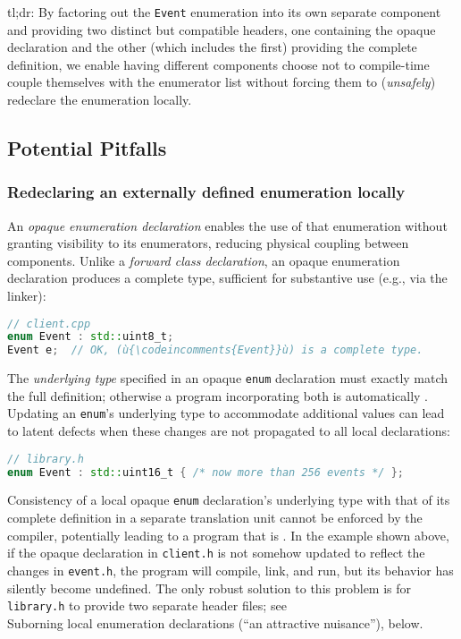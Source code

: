 tl;dr: By factoring out the \lstinline!Event! enumeration into its own
separate component and providing two distinct but compatible headers,
one containing the opaque declaration and the other (which includes the
first) providing the complete definition, we enable having different
components choose not to compile-time couple themselves with the
enumerator list without forcing them to (\emph{unsafely}) redeclare the
enumeration locally.

\subsection[Potential Pitfalls]{Potential Pitfalls}\label{potential-pitfalls-opaqueenum}

\subsubsection[Redeclaring an externally defined enumeration locally]{Redeclaring an externally defined enumeration locally}\label{redeclaring-an-externally-defined-enumeration-locally}

An \emph{opaque enumeration declaration} enables the use of that
enumeration without granting visibility to its enumerators, reducing
physical coupling between components. Unlike a \emph{forward class
declaration}, an opaque enumeration declaration produces a complete
type, sufficient for substantive use (e.g., via the linker):

\begin{lstlisting}[language=C++]
// client.cpp
enum Event : std::uint8_t;
Event e;  // OK, (ù{\codeincomments{Event}}ù) is a complete type.
\end{lstlisting}

\noindent The \emph{underlying type} specified in an opaque \lstinline!enum!
declaration must exactly match the full definition; otherwise a program
incorporating both is automatically . Updating an
\lstinline!enum!'s underlying type to accommodate additional values can
lead to latent defects when these changes are not propagated to all
local declarations:

\begin{lstlisting}[language=C++]
// library.h
enum Event : std::uint16_t { /* now more than 256 events */ };
\end{lstlisting}

\noindent Consistency of a local opaque \lstinline!enum! declaration's underlying
type with that of its complete definition in a separate translation unit
cannot be enforced by the compiler, potentially leading to a program
that is . In the example shown above, if the opaque
declaration in \lstinline!client.h! is not somehow updated to reflect the
changes in \lstinline!event.h!, the program will compile, link, and run,
but its behavior has silently become undefined. The only robust solution
to this problem is for \lstinline!library.h! to provide two separate header
files; see \\
Suborning local enumeration declarations (``an
attractive nuisance''), below.

